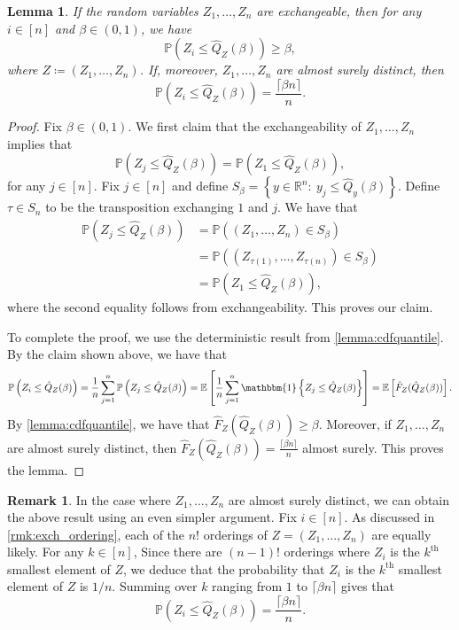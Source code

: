 \documentclass[11pt, titlepage]{article} %
\newcommand{\Prob}[1]{\mathbb{P}\left( #1 \right)}
\newcommand{\Exp}[3]{\mathbb{E}\left#2 #1 \right#3}
\newcommand{\Ind}[1]{\mathbbm{1}\left\{ #1 \right\}}
\numberwithin{equation}{section}
\newtheorem{lemma}{Lemma}
\theoremstyle{definition}
\newtheorem{remark}{Remark}
\numberwithin{theorem}{section}
\numberwithin{lemma}{section}
\numberwithin{corollary}{section}
\numberwithin{proposition}{section}
\numberwithin{definition}{section}
\numberwithin{remark}{section}
\begin{document}
\begin{lemma}
    If the random variables \(Z_1, \ldots, Z_n\) are exchangeable, then for any \(i \in [n]\) and \(\beta \in (0,1)\), we have \[\Prob{Z_i \leq \hat{Q}_Z (\beta)} \geq \beta,\] where \(Z \coloneqq (Z_1, \ldots, Z_n)\). If, moreover, \(Z_1, \ldots, Z_n\) are almost surely distinct, then \[\Prob{Z_i \leq \hat{Q}_Z(\beta)} = \frac{\lceil{\beta n}\rceil}{n}.\]
\label{lemma:exch_cdfquantile}
\end{lemma}
\begin{proof}
    Fix \(\beta \in (0,1)\). We first claim that the exchangeability of \(Z_1, \ldots, Z_n\) implies that \[\Prob{Z_j \leq \hat{Q}_Z(\beta)} = \Prob{Z_1 \leq \hat{Q}_Z(\beta)}, \] for any \(j \in [n]\). Fix \(j \in [n]\) and define \(S_\beta = \left\{ y \in \mathbb{R}^n : \ y_j \leq \hat{Q}_y(\beta) \right\}.\) Define \(\tau \in S_n\) to be the transposition exchanging \(1\) and \(j\). We have that  
    \begin{align*}
        \Prob{Z_j \leq \hat{Q}_Z(\beta)} &= \Prob{(Z_1, \ldots, Z_n) \in S_\beta} \\
        &= \Prob{(Z_{\tau(1)}, \ldots, Z_{\tau(n)}) \in S_\beta} \\
        &= \Prob{Z_1 \leq \hat{Q}_Z(\beta)},
    \end{align*} where the second equality follows from exchangeability. This proves our claim. \vskip 5pt
    
    \noindent
    To complete the proof, we use the deterministic result from \cref{lemma:cdfquantile}. By the claim shown above, we have that \begin{align*}
        \Prob{Z_i \leq \hat{Q}_Z(\beta)} = \frac{1}{n} \sum_{j=1}^n \Prob{Z_j \leq \hat{Q}_Z(\beta)} = \mathbb{E} \left[ \frac{1}{n} \sum_{j=1}^n \Ind{Z_j \leq \hat{Q}_Z(\beta)} \right]
        = \Exp{\hat{F}_Z(\hat{Q}_Z(\beta))}{[}{]}.
    \end{align*} By \cref{lemma:cdfquantile}, we have that \(\hat{F}_Z(\hat{Q}_Z(\beta)) \geq \beta\). Moreover, if \(Z_1, \ldots, Z_n\) are almost surely distinct, then \(\hat{F}_Z(\hat{Q}_Z(\beta)) = \frac{\lceil{\beta n}\rceil}{n}\) almost surely. This proves the lemma.
\end{proof}

\begin{remark}
    In the case where \(Z_1, \ldots, Z_n\) are almost surely distinct, we can obtain the above result using an even simpler argument. Fix \(i \in [n]\). As discussed in \cref{rmk:exch_ordering}, each of the \(n!\) orderings of \(Z = (Z_1, \ldots, Z_n)\) are equally likely. For any \(k \in [n]\), Since there are \((n-1)!\) orderings where \(Z_i\) is the \(k^\mathrm{th}\) smallest element of \(Z\), we deduce that the probability that \(Z_i\) is the \(k^\mathrm{th}\) smallest element of \(Z\) is \(1/n\). Summing over \(k\) ranging from \(1\) to \(\lceil \beta n \rceil\) gives that \[\Prob{Z_i \leq \hat{Q}_Z(\beta)} = \frac{\lceil{\beta n}\rceil}{n}.\]
\label{rmk:exch_rank_argument}
\end{remark}
\end{document}
